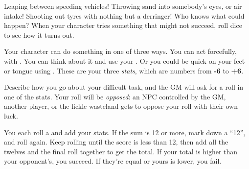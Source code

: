 
Leaping between speeding vehicles! Throwing sand into somebody's eyes, or air intake! Shooting out tyres with nothing but a derringer! Who knows what could happen? When your character tries something that might not succeed, roll dice to see how it turns out.

Your character can do something in one of three ways. You can act forcefully, with . You can think about it and use your . Or you could be quick on your feet or tongue using . These are your three \emph{stats}, which are numbers from \textbf{-6} to \textbf{+6}.

Describe how you go about your difficult task, and the GM will ask for a roll in one of the stats. Your roll will be \emph{opposed}: an NPC controlled by the GM, another player, or the fickle wasteland gets to oppose your roll with their own luck.

You each roll a  and add your stats. If the sum is 12 or more, mark down a ``12'', and roll again. Keep rolling until the score is less than 12, then add all the twelves and the final roll together to get the total. If your total is higher than your opponent's, you succeed. If they're equal or yours is lower, you fail.
